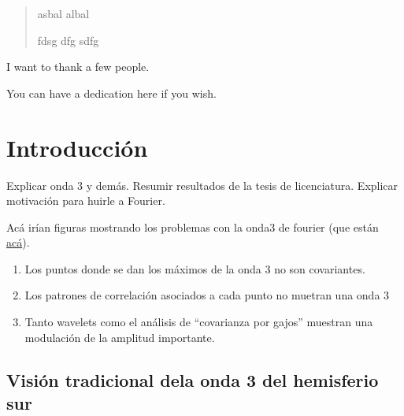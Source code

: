 \documentclass[12pt,oneside]{reedthesis}
\providecommand{\tightlist}{%
  \setlength{\itemsep}{0pt}\setlength{\parskip}{0pt}}
\begin{document}
  \begin{abstract}
    asbal albal

    fdsg dfg sdfg
  \end{abstract}



  \begin{acknowledgements}
    I want to thank a few people.
  \end{acknowledgements}


  \hypersetup{linkcolor=black}
  \setcounter{secnumdepth}{3}
  \setcounter{tocdepth}{3}
  \tableofcontents

  \listoftables

  \listoffigures

  \begin{dedication}
    You can have a dedication here if you wish.
  \end{dedication}

\mainmatter %
\pagestyle{fancyplain} %

\hypertarget{introducciuxf3n}{%
\section{Introducción}\label{introducciuxf3n}}

Explicar onda 3 y demás. Resumir resultados de la tesis de licenciatura.
Explicar motivación para huirle a Fourier.

Acá irían figuras mostrando los problemas con la onda3 de fourier (que están \href{http://htmlpreview.github.io/?https://github.com/eliocamp/onda3/blob/master/30-no-zw.html}{acá}).

\begin{enumerate}
\def\labelenumi{\arabic{enumi}.}
\tightlist
\item
  Los puntos donde se dan los máximos de la onda 3 no son covariantes.
\item
  Los patrones de correlación asociados a cada punto no muetran una onda 3
\item
  Tanto wavelets como el análisis de ``covarianza por gajos'' muestran una modulación de la amplitud importante.
\end{enumerate}

\hypertarget{visiuxf3n-tradicional-dela-onda-3-del-hemisferio-sur}{%
\subsection{Visión tradicional dela onda 3 del hemisferio sur}\label{visiuxf3n-tradicional-dela-onda-3-del-hemisferio-sur}}
\end{document}
